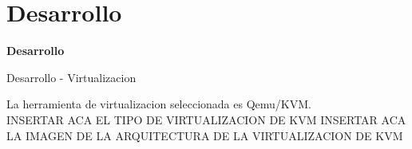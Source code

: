 \documentclass{beamer}
\begin{document}
\section{Desarrollo}

\begin{frame}
    \Huge
    \centering
    \textbf{ Desarrollo }

\end{frame}

\begin{frame}{Desarrollo - Virtualizacion}

\vspace{-1.5cm}
La herramienta de virtualizacion seleccionada es Qemu/KVM.\\
INSERTAR ACA EL TIPO DE VIRTUALIZACION DE KVM
INSERTAR ACA LA IMAGEN DE LA ARQUITECTURA DE LA VIRTUALIZACION DE KVM
\end{frame}
\end{document}
